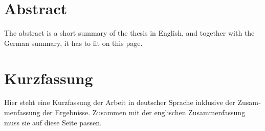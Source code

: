 \thispagestyle{plain}

\section*{Abstract}
The abstract is a short summary of the thesis in English, and together with the German summary, it has to fit on this page.

\section*{Kurzfassung}
\begin{otherlanguage}{ngerman}
Hier steht eine Kurzfassung der Arbeit in deutscher Sprache inklusive der Zusammenfassung der
Ergebnisse.
Zusammen mit der englischen Zusammenfassung muss sie auf diese Seite passen.
\end{otherlanguage}

\listoftodos

